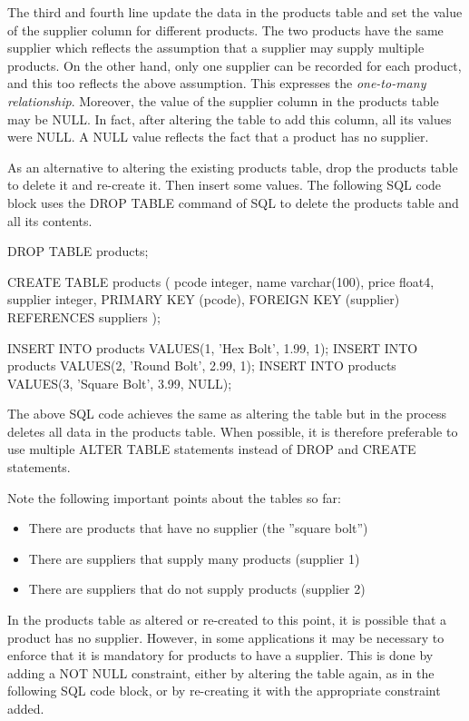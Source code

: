 The third and fourth line update the data in the products table and set the value of the supplier column for different products. The two products have the same supplier which reflects the assumption that a supplier may supply multiple products. On the other hand, only one supplier can be recorded for each product, and this too reflects the above assumption. This expresses the \emph{one-to-many relationship}. Moreover, the value of the supplier column in the products table may be NULL. In fact, after altering the table to add this column, all its values were NULL. A NULL value reflects the fact that a product has no supplier.

As an alternative to altering the existing products table, drop the products table to delete it and re-create it. Then insert some values. The following SQL code block uses the DROP TABLE command of SQL to delete the products table and all its contents.

\begin{samepage}
\begin{sqlcode}
DROP TABLE products;

CREATE TABLE products (
  pcode    integer,
  name     varchar(100),
  price    float4,
  supplier integer,
  PRIMARY KEY (pcode),
  FOREIGN KEY (supplier) REFERENCES suppliers 
);
  
INSERT INTO products VALUES(1, 'Hex Bolt', 1.99, 1);
INSERT INTO products VALUES(2, 'Round Bolt', 2.99, 1);
INSERT INTO products VALUES(3, 'Square Bolt', 3.99, NULL);
\end{sqlcode}
\end{samepage}

The above SQL code achieves the same as altering the table but in the process deletes all data in the products table. When possible, it is therefore preferable to use multiple ALTER TABLE statements instead of DROP and CREATE statements. 

Note the following important points about the tables so far:
\begin{itemize}
  \item There are products that have no supplier (the ''square bolt'')
  \item There are suppliers that supply many products (supplier 1)
  \item There are suppliers that do not supply products (supplier 2)
\end{itemize}

In the products table as altered or re-created to this point, it is possible that a product has no supplier. However, in some applications it may be necessary to enforce that it is mandatory for products to have a supplier. This is done by adding a NOT NULL constraint, either by altering the table again, as in the following SQL code block, or by re-creating it with the appropriate constraint added.

